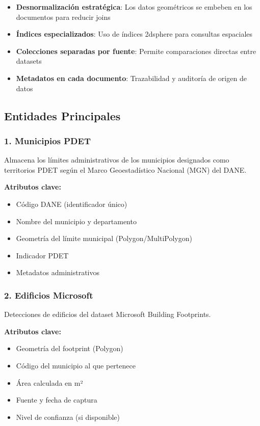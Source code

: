 \documentclass[12pt,a4paper]{article}
\begin{document}
\begin{itemize}[leftmargin=*]
    \item \textbf{Desnormalización estratégica}: Los datos geométricos se embeben en los documentos para reducir joins
    \item \textbf{Índices especializados}: Uso de índices 2dsphere para consultas espaciales
    \item \textbf{Colecciones separadas por fuente}: Permite comparaciones directas entre datasets
    \item \textbf{Metadatos en cada documento}: Trazabilidad y auditoría de origen de datos
\end{itemize}

\subsection{Entidades Principales}

\subsubsection{1. Municipios PDET}

Almacena los límites administrativos de los municipios designados como territorios PDET según el Marco Geoestadístico Nacional (MGN) del DANE.

\textbf{Atributos clave:}
\begin{itemize}
    \item Código DANE (identificador único)
    \item Nombre del municipio y departamento
    \item Geometría del límite municipal (Polygon/MultiPolygon)
    \item Indicador PDET
    \item Metadatos administrativos
\end{itemize}

\subsubsection{2. Edificios Microsoft}

Detecciones de edificios del dataset Microsoft Building Footprints.

\textbf{Atributos clave:}
\begin{itemize}
    \item Geometría del footprint (Polygon)
    \item Código del municipio al que pertenece
    \item Área calculada en m²
    \item Fuente y fecha de captura
    \item Nivel de confianza (si disponible)
\end{itemize}
\end{document}

